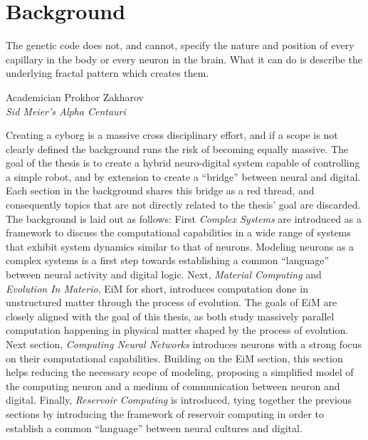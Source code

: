 \chapter{Background}
\epigraph{
The genetic code does not, and cannot, specify the nature and position of every
capillary in the body or every neuron in the brain. What it can do is describe
the underlying fractal pattern which creates them.}{Academician Prokhor
Zakharov \\\textit{Sid Meier's Alpha Centauri}}
Creating a cyborg is a massive cross disciplinary effort, and if a scope is not
clearly defined the background runs the risk of becoming equally massive.
The goal of the thesis is to create a hybrid neuro-digital system capable of
controlling a simple robot, and by extension to create a ``bridge'' between
neural and digital.
Each section in the background shares this bridge as a red thread, and
consequently topics that are not directly related to the thesis' goal are discarded.
The background is laid out as follows:
First \emph{Complex Systems} are introduced as a framework to discuss the computational
capabilities in a wide range of systems that exhibit system dynamics similar to
that of neurons.
Modeling neurons as a complex systems is a first step towards establishing a
common ``language'' between neural activity and digital logic.
%
Next, \emph{Material Computing} and \emph{Evolution In Materio}, EiM for short,
introduces computation done in unstructured matter through the process of
evolution. The goals of EiM are closely aligned with the goal of this thesis, as
both study massively parallel computation happening in physical matter shaped by
the process of evolution.
%
Next section, \emph{Computing Neural Networks} introduces neurons with a strong
focus on their computational capabilities. Building on the EiM section, this
section helps reducing the necessary scope of modeling, proposing a simplified
model of the computing neuron and a medium of communication between neuron and
digital.
%
Finally, \emph{Reservoir Computing} is introduced, tying together the previous
sections by introducing the framework of reservoir computing in order to
establish a common ``language'' between neural cultures and digital.
%
